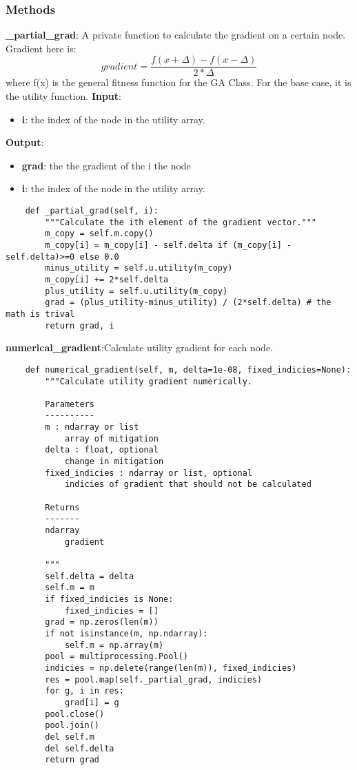 \documentclass[12pt]{article}
\begin{document}
\subsubsection{Methods}
\textbf{\_partial\_grad}: A private function to calculate the gradient on a certain node. Gradient here is:
\begin{equation}\label{gradient}
  gradient = \frac{f(x+\Delta)-f(x-\Delta)}{2*\Delta}
\end{equation}
where f(x) is the general fitness function for the GA Class. For the base case, it is the utility function.
\textbf{Input}:
\begin{itemize}
  \item \textbf{i}: the index of the node in the utility array.
\end{itemize}
\textbf{Output}:
\begin{itemize}
  \item \textbf{grad}: the the gradient of the i the node
  \item \textbf{i}: the index of the node in the utility array.
\end{itemize}
\begin{verbatim}
	def _partial_grad(self, i):
		"""Calculate the ith element of the gradient vector."""
		m_copy = self.m.copy()
		m_copy[i] = m_copy[i] - self.delta if (m_copy[i] - self.delta)>=0 else 0.0
		minus_utility = self.u.utility(m_copy)
		m_copy[i] += 2*self.delta
		plus_utility = self.u.utility(m_copy)
		grad = (plus_utility-minus_utility) / (2*self.delta) # the math is trival
		return grad, i
\end{verbatim}
\textbf{numerical\_gradient}:Calculate utility gradient for each node.
\begin{verbatim}
	def numerical_gradient(self, m, delta=1e-08, fixed_indicies=None):
		"""Calculate utility gradient numerically.

		Parameters
		----------
		m : ndarray or list
			array of mitigation
		delta : float, optional
			change in mitigation
		fixed_indicies : ndarray or list, optional
			indicies of gradient that should not be calculated

		Returns
		-------
		ndarray
			gradient

		"""
		self.delta = delta
		self.m = m
		if fixed_indicies is None:
			fixed_indicies = []
		grad = np.zeros(len(m))
		if not isinstance(m, np.ndarray):
			self.m = np.array(m)
		pool = multiprocessing.Pool()
		indicies = np.delete(range(len(m)), fixed_indicies)
		res = pool.map(self._partial_grad, indicies)
		for g, i in res:
			grad[i] = g
		pool.close()
		pool.join()
		del self.m
		del self.delta
		return grad

\end{verbatim}
\end{document}
